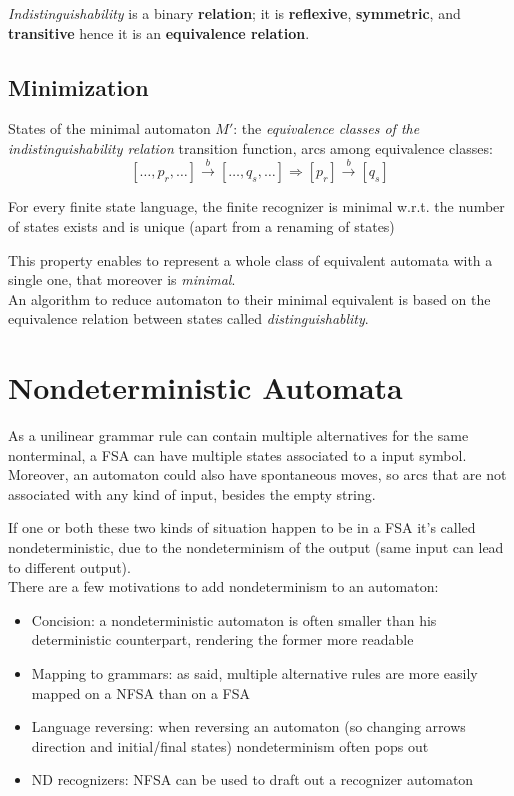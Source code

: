 		\emph{Indistinguishability} is a binary \textbf{relation}; it is \textbf{reflexive}, \textbf{symmetric}, and \textbf{transitive} hence it is an \textbf{equivalence relation}.

		\subsection{Minimization}
			States of the minimal automaton $M'$: the \emph{equivalence classes of the indistinguishability relation} transition function, arcs among equivalence classes:
			$$[\ldots,p_r, \ldots] \overset{b}{\longrightarrow} [\ldots, q_s, \ldots] \Rightarrow [p_r] \overset{b}{\longrightarrow} [q_s]$$
			\begin{property}
				For every finite state language, the finite recognizer is minimal w.r.t. the number of states exists and is unique (apart from a renaming of states)
			\end{property}
			This property enables to represent a whole class of equivalent automata with a single one, that moreover is \emph{minimal}.\\
			An algorithm to reduce automaton to their minimal equivalent is based on the equivalence relation between states called \emph{distinguishablity}.	
	\section{Nondeterministic Automata}
		As a unilinear grammar rule can contain multiple alternatives for the same nonterminal, a FSA can have multiple states associated to a input symbol.
		Moreover, an automaton could also have spontaneous moves, so arcs that are not associated with any kind of input, besides the empty string.
		
		If one or both these two kinds of situation happen to be in a FSA it's called nondeterministic, due to the nondeterminism of the output (same input can lead to different output).\\
		There are a few motivations to add nondeterminism to an automaton:
		\begin{itemize}
			\item Concision: a nondeterministic automaton is often smaller than his deterministic counterpart, rendering the former more readable
			\item Mapping to grammars: as said, multiple alternative rules are more easily mapped on a NFSA than on a FSA
			\item Language reversing: when reversing an automaton (so changing arrows direction and initial/final states) nondeterminism often pops out
			\item ND recognizers: NFSA can be used to draft out a recognizer automaton
		\end{itemize}
